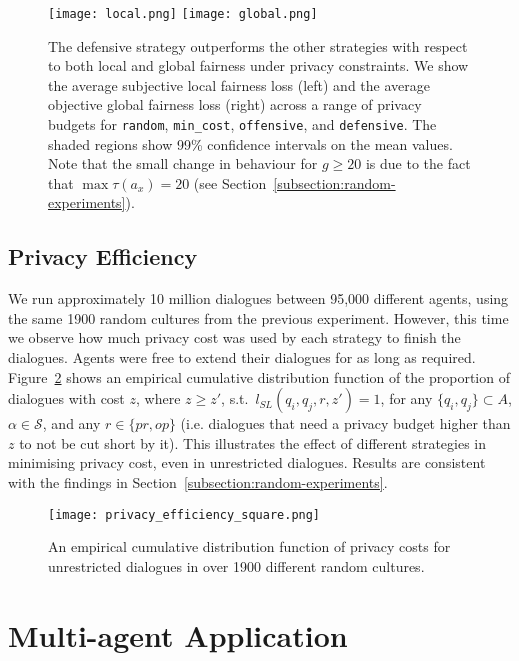 \documentclass[acmsmall]{custom-arxiv}  %
\begin{document}
\begin{figure}
\texttt{[image: local.png]}
\texttt{[image: global.png]}

\caption{The defensive strategy outperforms the other strategies with respect to both local and global fairness under privacy constraints. We show the average subjective local fairness loss (left) and the average objective global fairness loss (right) across a range of privacy budgets for \texttt{random}, \texttt{min\_cost}, \texttt{offensive}, and \texttt{defensive}. The shaded regions show 99\% confidence intervals on the mean values. Note that the small change in behaviour for $g \geq 20$ is due to the fact that $\max \tau(a_x) = 20$ (see Section~\ref{subsection:random-experiments}).}
\label{fig:local_global}
\end{figure}

\subsection{Privacy Efficiency}
\label{subsection:privacy-efficiency}

We run approximately 10 million dialogues between 95,000 different agents, using the same 1900 random cultures from the previous experiment. However, this time we observe how much privacy cost was used by each strategy to finish the dialogues. Agents were free to extend their dialogues for as long as required. Figure~\ref{fig:privacy-efficiency-random} shows an empirical cumulative distribution function of the proportion of dialogues with cost $z$, where $z \geq z'$, s.t.~$l_{SL}(q_i, q_j, r, z') = 1$, for any $\{q_i, q_j\} \subset A$, $\alpha \in \mathcal{S}$, and any $r \in \{pr, op\}$ (i.e. dialogues that need a privacy budget higher than $z$ to not be cut short by it). This illustrates the effect of different strategies in minimising privacy cost, even in unrestricted dialogues. Results are consistent with the findings in Section~\ref{subsection:random-experiments}.

\begin{figure}
\centering
\texttt{[image: privacy\_efficiency\_square.png]}
\caption{An empirical cumulative distribution function of privacy costs for unrestricted dialogues in over 1900 different random cultures.}
\label{fig:privacy-efficiency-random}
\end{figure}




\section{Multi-agent Application}
\label{section:boats}
\end{document}
